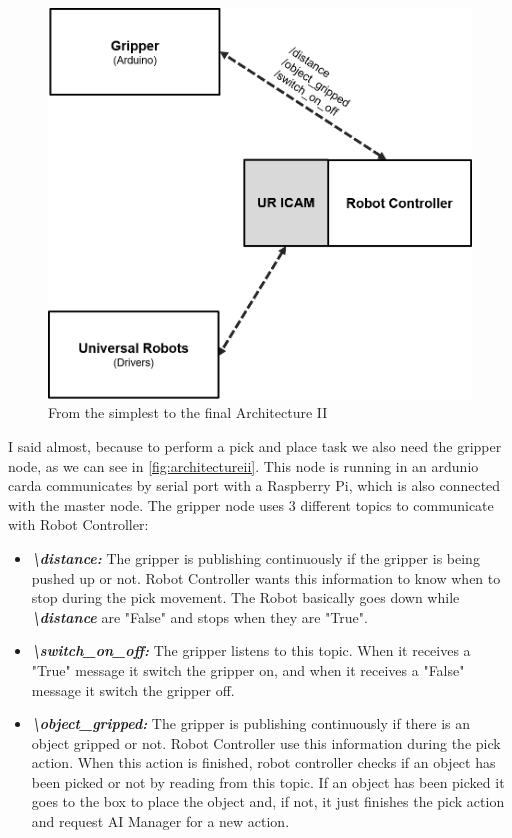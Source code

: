 		\begin{figure}[H]
			\centering
			\includegraphics[width=0.7\linewidth]{Images/ArchitectureII}
			\caption[Architecture II]{From the simplest to the final Architecture II}
			\label{fig:architectureii}
		\end{figure}
	
		I said almost, because to perform a pick and place task we also need the gripper node, as we can see in \autoref{fig:architectureii}. This node is running in an ardunio carda communicates by serial port with a Raspberry Pi, which is also connected with the master node. The gripper node uses 3 different topics to communicate with Robot Controller:
		
		\begin{itemize}
			\item[\textendash]\textbf{\textit{\textbackslash distance: }} The gripper is publishing continuously if the gripper is being pushed up or not. Robot Controller wants this information to know when to stop during the pick movement. The Robot basically goes down while \textbf{\textit{\textbackslash distance}} are "False" and stops when they are "True".
			\item[\textendash]\textbf{\textit{\textbackslash switch\_on\_off: }} The gripper listens to this topic. When it receives a "True" message it switch the gripper on, and when it receives a "False" message it switch the gripper off.
			\item[\textendash]\textbf{\textit{\textbackslash object\_gripped: }} The gripper is publishing continuously if there is an object gripped or not. Robot Controller use this information during the pick action. When this action is finished, robot controller checks if an object has been picked or not by reading from this topic. If an object has been picked it goes to the box to place the object and, if not, it just finishes the pick action and request AI Manager for a new action.
		\end{itemize}
	
